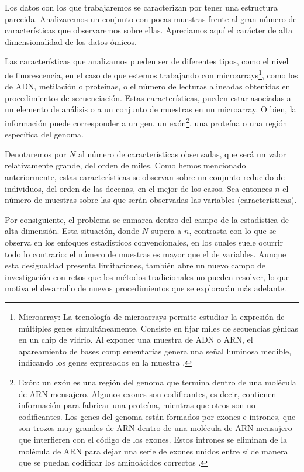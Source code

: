 Los datos con los que trabajaremos se caracterizan por tener una estructura parecida. Analizaremos un
conjunto con pocas muestras frente al gran número de características que observaremos sobre ellas. Apreciamos
aquí el carácter de alta dimensionalidad de los datos ómicos. \newline

Las características que analizamos pueden ser de diferentes tipos, como el nivel de fluorescencia, en el caso
de que estemos trabajando con microarrays\footnote[1]{Microarray: La tecnología de microarrays permite estudiar 
la expresión de múltiples genes simultáneamente. Consiste en fijar miles de secuencias génicas en un chip de vidrio. 
Al exponer una muestra de ADN o ARN, el apareamiento de bases complementarias genera una señal luminosa medible, 
indicando los genes expresados en la muestra \cite{microarray-definition}.}, como los de ADN, metilación o proteínas, o el número de lecturas 
alineadas obtenidas en procedimientos de secuenciación. Estas características, pueden estar asociadas a un
elemento de análisis o a un conjunto de muestras en un microarray. O bien, la información puede corresponder a
un gen, un exón\footnote[2]{Exón: un exón es una región del genoma que termina dentro de una molécula de ARN mensajero.
Algunos exones son codificantes, es decir, contienen información para fabricar una proteína, mientras que otros 
son no codificantes. Los genes del genoma están formados por exones e intrones, que son trozos muy grandes de ARN 
dentro de una molécula de ARN mensajero que interfieren con el código de los exones. 
Estos intrones se eliminan de la molécula de ARN para dejar una serie de exones unidos entre sí de manera que se 
puedan codificar los aminoácidos correctos \cite{exon-definition}\cite{intron-definition}.}, una proteína o una región específica del genoma. \newline

Denotaremos por $N$ al número de características observadas, que será un valor relativamente grande, del orden
de miles. Como hemos mencionado anteriormente, estas características se observan sobre un conjunto reducido de 
individuos, del orden de las decenas, en el mejor de los casos. Sea entonces $n$ el número de muestras sobre
las que serán observadas las variables (características). \newline

Por consiguiente, el problema se enmarca dentro del campo de la estadística de alta dimensión. Esta
situación, donde $N$ supera a $n$, contrasta con lo que se observa en los enfoques estadísticos convencionales,
en los cuales suele ocurrir todo lo contrario: el número de muestras es mayor que el de variables. Aunque esta
desigualdad presenta limitaciones, también abre un nuevo campo de investigación con retos que los métodos 
tradicionales no pueden resolver, lo que motiva el desarrollo de nuevos procedimientos que se explorarán más 
adelante. \newline

